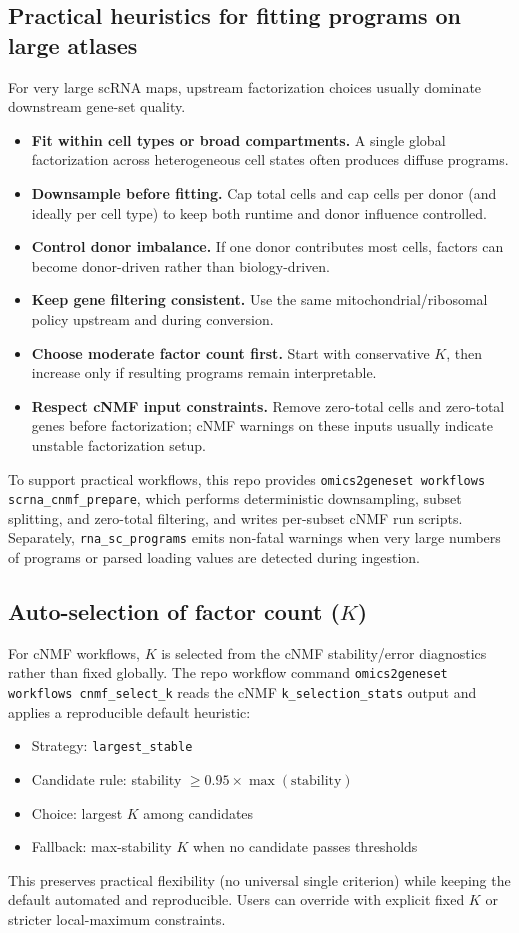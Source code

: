\documentclass[11pt]{article}
\begin{document}
\subsection*{Practical heuristics for fitting programs on large atlases}
For very large scRNA maps, upstream factorization choices usually dominate downstream gene-set quality.
\begin{itemize}[leftmargin=2em]
\item \textbf{Fit within cell types or broad compartments.} A single global factorization across heterogeneous cell states often produces diffuse programs.
\item \textbf{Downsample before fitting.} Cap total cells and cap cells per donor (and ideally per cell type) to keep both runtime and donor influence controlled.
\item \textbf{Control donor imbalance.} If one donor contributes most cells, factors can become donor-driven rather than biology-driven.
\item \textbf{Keep gene filtering consistent.} Use the same mitochondrial/ribosomal policy upstream and during conversion.
\item \textbf{Choose moderate factor count first.} Start with conservative $K$, then increase only if resulting programs remain interpretable.
\item \textbf{Respect cNMF input constraints.} Remove zero-total cells and zero-total genes before factorization; cNMF warnings on these inputs usually indicate unstable factorization setup.
\end{itemize}
To support practical workflows, this repo provides \texttt{omics2geneset workflows scrna\_cnmf\_prepare}, which performs deterministic downsampling, subset splitting, and zero-total filtering, and writes per-subset cNMF run scripts. Separately, \texttt{rna\_sc\_programs} emits non-fatal warnings when very large numbers of programs or parsed loading values are detected during ingestion.

\subsection*{Auto-selection of factor count ($K$)}
For cNMF workflows, $K$ is selected from the cNMF stability/error diagnostics rather than fixed globally.
The repo workflow command \texttt{omics2geneset workflows cnmf\_select\_k} reads the cNMF
\texttt{k\_selection\_stats} output and applies a reproducible default heuristic:
\begin{itemize}[leftmargin=2em]
\item Strategy: \texttt{largest\_stable}
\item Candidate rule: stability $\ge 0.95 \times \max(\text{stability})$
\item Choice: largest $K$ among candidates
\item Fallback: max-stability $K$ when no candidate passes thresholds
\end{itemize}
This preserves practical flexibility (no universal single criterion) while keeping the default automated and reproducible.
Users can override with explicit fixed $K$ or stricter local-maximum constraints.
\end{document}
